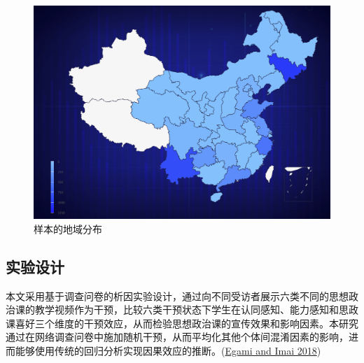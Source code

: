 \documentclass[
  12pt,
]{ctexart}
\begin{document}
\begin{figure}[h]

{\centering \includegraphics[width=0.9\linewidth]{../figures/figure2} 

}

\caption{样本的地域分布}\label{fig:unnamed-chunk-2}
\end{figure}

\hypertarget{ux5b9eux9a8cux8bbeux8ba1}{%
\subsection{实验设计}\label{ux5b9eux9a8cux8bbeux8ba1}}

本文采用基于调查问卷的析因实验设计，通过向不同受访者展示六类不同的思想政治课的教学视频作为干预，比较六类干预状态下学生在认同感知、能力感知和思政课喜好三个维度的干预效应，从而检验思想政治课的宣传效果和影响因素。本研究通过在网络调查问卷中施加随机干预，从而平均化其他个体间混淆因素的影响，进而能够使用传统的回归分析实现因果效应的推断。(\protect\hyperlink{ref-EgamiImai2018}{Egami and Imai 2018})
\end{document}
